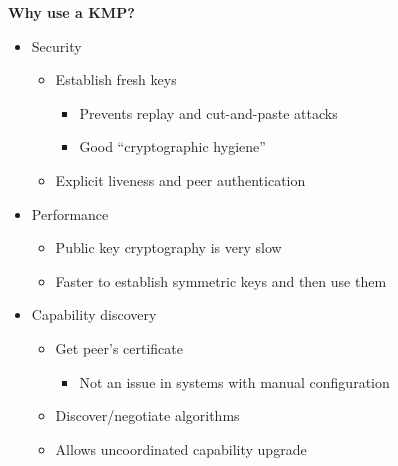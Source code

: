 \documentclass[helvetica]{seminar}
\newcommand{\heading}[1]{%
  \begin{center} 
    \large\bf 
    #1 
  \end{center} 
  \vspace{.4 in}}
\begin{document}
\begin{slide}
\heading{Why use a KMP?}

\vspace{-.35 in}
\begin{itemize}
\item Security
\begin{itemize}
\item Establish fresh keys
\begin{itemize}
\item Prevents replay and cut-and-paste attacks
\item Good ``cryptographic hygiene''
\end{itemize}
\item Explicit liveness and peer authentication
\end{itemize}
\item Performance
\begin{itemize}
\item Public key cryptography is very slow
\item Faster to establish symmetric keys and then use them
\end{itemize}
\item Capability discovery
\begin{itemize}
\item Get peer's certificate
\begin{itemize}
\item Not an issue in systems with manual configuration
\end{itemize}
\item Discover/negotiate algorithms
\item Allows uncoordinated capability upgrade
\end{itemize}
\end{itemize}
\end{slide}
\end{document}
